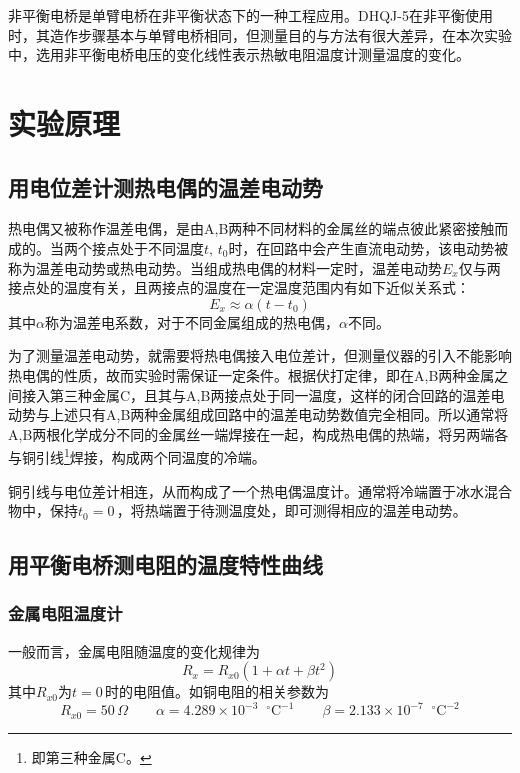 \documentclass[UTF-8,twoside,cs4size]{ctexart}
\newcommand*{\mcelsius}{\mathop{}\!{^\circ}\mathrm{C}}
\begin{document}
	非平衡电桥是单臂电桥在非平衡状态下的一种工程应用。DHQJ-5在非平衡使用时，其造作步骤基本与单臂电桥相同，但测量目的与方法有很大差异，在本次实验中，选用非平衡电桥电压的变化线性表示热敏电阻温度计测量温度的变化。
	
	\section{实验原理}
	\subsection{用电位差计测热电偶的温差电动势}
	热电偶又被称作温差电偶，是由A,B两种不同材料的金属丝的端点彼此紧密接触而成的。当两个接点处于不同温度$ t,\,t_0 $时，在回路中会产生直流电动势，该电动势被称为温差电动势或热电动势。当组成热电偶的材料一定时，温差电动势$ E_x $仅与两接点处的温度有关，且两接点的温度在一定温度范围内有如下近似关系式：
	\[E_x\approx\alpha(t-t_0)\]
	其中$ \alpha $称为温差电系数，对于不同金属组成的热电偶，$ \alpha $不同。%
	
	为了测量温差电动势，就需要将热电偶接入电位差计，但测量仪器的引入不能影响热电偶的性质，故而实验时需保证一定条件。根据伏打定律，即在A,B两种金属之间接入第三种金属C，且其与A,B两接点处于同一温度，这样的闭合回路的温差电动势与上述只有A,B两种金属组成回路中的温差电动势数值完全相同。所以通常将A,B两根化学成分不同的金属丝一端焊接在一起，构成热电偶的热端，将另两端各与铜引线\footnote{即第三种金属C。}焊接，构成两个同温度的冷端。
	
	铜引线与电位差计相连，从而构成了一个热电偶温度计。通常将冷端置于冰水混合物中，保持$ t_0=0 $\,\textcelsius，将热端置于待测温度处，即可测得相应的温差电动势。%
	
	
	\subsection{用平衡电桥测电阻的温度特性曲线}
	\subsubsection{金属电阻温度计}
	一般而言，金属电阻随温度的变化规律为
	\[R_x=R_{x0}(1+\alpha t+\beta t^2)\]
	其中$ R_{x0} $为$ t=0 $\,\textcelsius 时的电阻值。如铜电阻的相关参数为
	\[R_{x0}=50\,\Omega\qquad \alpha=4.289\times10^{-3}\mcelsius^{-1}\qquad \beta=2.133\times10^{-7}\mcelsius^{-2}\]
	
\end{document}
